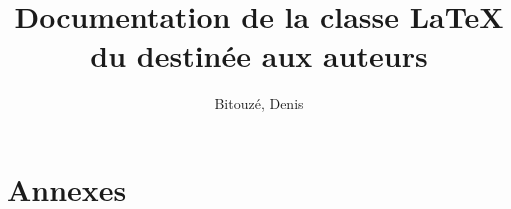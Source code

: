 \documentclass[french]{nwejmart}
\newtheorem[title=Fait,style=definition]{fact}
\begin{document}
\title[Documentation de la classe \LaTeX{} du \texorpdfstring{\nwejm{}}{NWEJM}]{Documentation de la classe \LaTeX{} du \nwejm*{} destinée aux auteurs}
%
\author[%
affiliation={%
  Université du Littoral Côte d'Opale, Laboratoire de mathématiques pures et
  appliquées (\nolinkurl{denis.bitouze@lmpa.univ-littoral.fr})%
},%
]{Bitouzé, Denis}
%
\maketitle
%
\etocarticlestylenomarks
\localtableofcontents
%


%
\section{Annexes}


%
\printbibliography
%
%
\printindex
\end{document}
